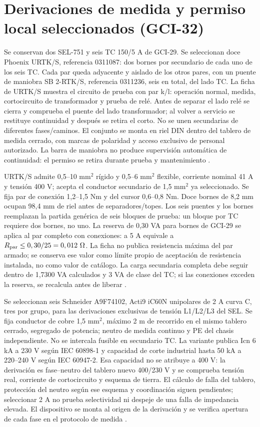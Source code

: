 \section{Derivaciones de medida y permiso local seleccionados (GCI-32)}
\label{sec:sd4-derivacion-gci32}
Se conservan dos SEL-751 y seis TC 150/5 A de GCI-29. Se seleccionan doce Phoenix URTK/S, referencia 0311087: dos bornes por secundario de cada uno de los seis TC. Cada par queda adyacente y aislado de los otros pares, con un puente de maniobra SB 2-RTK/S, referencia 0311236, seis en total, del lado TC. La ficha de URTK/S muestra el circuito de prueba con par k/l: operación normal, medida, cortocircuito de transformador y prueba de relé. Antes de separar el lado relé se cierra y comprueba el puente del lado transformador; al volver a servicio se restituye continuidad y después se retira el corto. No se unen secundarias de diferentes fases/caminos. El conjunto se monta en riel DIN dentro del tablero de medida cerrado, con marcas de polaridad y acceso exclusivo de personal autorizado. La barra de maniobra no produce supervisión automática de continuidad: el permiso se retira durante prueba y mantenimiento \parencites[pp.~1--3 y 6--10]{lote32-urtk}{lote32-sb2}.

URTK/S admite 0,5--10 mm$^2$ rígido y 0,5--6 mm$^2$ flexible, corriente nominal 41 A y tensión 400 V; acepta el conductor secundario de 1,5 mm$^2$ ya seleccionado. Se fija par de conexión 1,2--1,5 Nm y del cursor 0,6--0,8 Nm. Doce bornes de 8,2 mm ocupan 98,4 mm de riel antes de separadores/topes. Los seis puentes y los bornes reemplazan la partida genérica de seis bloques de prueba: un bloque por TC requiere dos bornes, no uno. La reserva de 0,30 VA para bornes de GCI-29 se aplica al par completo con conexiones: a 5 A equivale a $R_{\rm par}\le0,30/25=0,012~\Omega$. La ficha no publica resistencia máxima del par armado; se conserva ese valor como límite propio de aceptación de resistencia instalada, no como valor de catálogo. La carga secundaria completa debe seguir dentro de 1,7300 VA calculados y 3 VA de clase del TC; si las conexiones exceden la reserva, se recalcula antes de liberar \parencite[pp.~1--3]{lote32-urtk}.

Se seleccionan seis Schneider A9F74102, Acti9 iC60N unipolares de 2 A curva C, tres por grupo, para las derivaciones exclusivas de tensión L1/L2/L3 del SEL. Se fija conductor de cobre 1,5 mm$^2$, máximo 2 m de recorrido en el mismo tablero cerrado, segregado de potencia; neutro de medida continuo y PE del chasis independiente. No se intercala fusible en secundario TC. La variante publica Icn 6 kA a 230 V según IEC 60898-1 y capacidad de corte industrial hasta 50 kA a 220--240 V según IEC 60947-2. Esa capacidad no se atribuye a 400 V: la derivación es fase--neutro del tablero nuevo 400/230 V y se comprueba tensión real, corriente de cortocircuito y esquema de tierra. El cálculo de falla del tablero, protección del neutro según ese esquema y coordinación siguen pendientes; seleccionar 2 A no prueba selectividad ni despeje de una falla de impedancia elevada. El dispositivo se monta al origen de la derivación y se verifica apertura de cada fase en el protocolo de medida \parencite{lote32-mcb2}.

